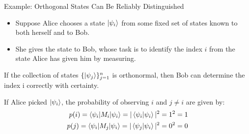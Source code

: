 \documentclass[handout, 10 pt]{beamer}
\begin{document}

\begin{frame}{Example: Orthogonal States Can Be Reliably Distinguished}
\begin{block}{}
\begin{itemize}
    \item Suppose Alice chooses a state $\ket{\psi_i}$ from some fixed set of states known to both herself and to Bob.
    \pause
    \item She gives the state to Bob, whose task is to identify the index $i$ from the state Alice has given him by measuring.
\end{itemize}
\end{block}
\pause

If the collection of states $\{\ket{\psi_j}\}_{j=1}^n$ is orthonormal, then Bob can determine the index i correctly with certainty.
\pause
\bigskip

If Alice picked $\ket{\psi_i}$, the probability of observing $i$ and $j\neq i$ are given by:
\begin{align}
p(i)=\braket{\psi_i | M_i |\psi_i}=|\braket{\psi_i |\psi_i}|^2=1^2=1\\
p(j)=\braket{\psi_i | M_j |\psi_i}=|\braket{\psi_j |\psi_i}|^2=0^2=0
\end{align}
\end{frame}
\end{document}
